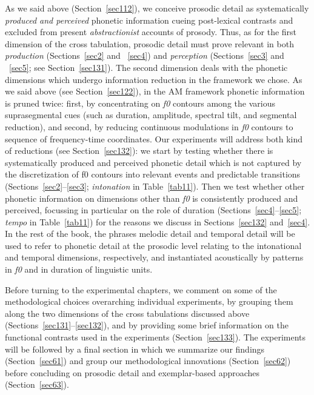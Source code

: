 As we said above (Section~\ref{sec112}), we conceive prosodic detail as systematically \textit{produced and perceived} phonetic information cueing post-lexical contrasts and excluded from present \textit{abstractionist} accounts of prosody. Thus, as for the first dimension of the cross tabulation, prosodic detail must prove relevant in both \textit{production} (Sections~\ref{sec2} and ~\ref{sec4}) and \textit{perception} (Sections~\ref{sec3} and ~\ref{sec5}; see Section~\ref{sec131}). The second dimension deals with the phonetic dimensions which undergo information reduction in the framework we chose. As we said above (see Section~\ref{sec122}), in the AM framework phonetic information is pruned twice: first, by concentrating on \textit{f0} contours among the various suprasegmental cues (such as duration, amplitude, spectral tilt, and segmental reduction), and second, by reducing continuous modulations in \textit{f0} contours to sequence of frequency-time coordinates. Our experiments will address both kind of reductions (see Section~\ref{sec132}): we start by testing whether there is systematically produced and perceived phonetic detail which is not captured by the discretization of f0 contours into relevant events and predictable transitions (Sections~\ref{sec2}--\ref{sec3}; \textit{intonation} in Table~\ref{tab11}). Then we test whether other phonetic information on dimensions other than \textit{f0} is consistently produced and perceived, focussing in particular on the role of duration (Sections~\ref{sec4}--\ref{sec5}; \textit{tempo} in Table~\ref{tab11}) for the reasons we discuss in Sections~\ref{sec132} and~\ref{sec4}. In the rest of the book, the phrases melodic detail and temporal detail will be used to refer to phonetic detail at the prosodic level relating to the intonational and temporal dimensions, respectively, and instantiated acoustically by patterns in \textit{f0} and in duration of linguistic units.

Before turning to the experimental chapters, we comment on some of the methodological choices overarching individual experiments, by grouping them along the two dimensions of the cross tabulations discussed above (Sections~\ref{sec131}--\ref{sec132}), and by providing some brief information on the functional contrasts used in the experiments (Section~\ref{sec133}). The experiments will be followed by a final section in which we summarize our findings (Section~\ref{sec61}) and group our methodological innovations (Section~\ref{sec62}) before concluding on prosodic detail and exemplar-based approaches (Section~\ref{sec63}).

